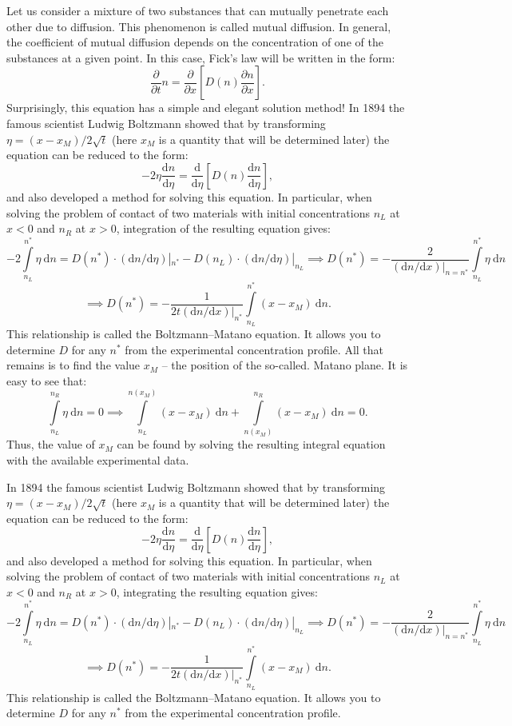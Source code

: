 \documentclass[11pt,a4paper]{article}
\begin{document}
Let us consider a mixture of two substances that can mutually penetrate each other due to diffusion. This phenomenon is called mutual diffusion. In general, the coefficient of mutual diffusion depends on the concentration of one of the substances at a given point. In this case, Fick's law will be written in the form: \[\frac{\partial}{\partial t}n=\frac{\partial}{\partial x}\left[D(n)\frac{\partial n}{\partial x}\right].\]Surprisingly, this equation has a simple and elegant solution method! In 1894 the famous scientist Ludwig Boltzmann showed that by transforming $\eta=(x-x_M)/2\sqrt t$ (here $x_M$ is a quantity that will be determined later) the equation can be reduced to the form: \[-2\eta\frac{\mathrm dn}{\mathrm d\eta}=\frac{\mathrm d}{\mathrm d\eta}\left[D(n)\frac{\mathrm dn}{\mathrm d\eta}\right],\] and also developed a method for solving this equation. In particular, when solving the problem of contact of two materials with initial concentrations $n_L$ at $x < 0$ and $n_R$ at $x > 0$, integration of the resulting equation gives: \[-2\int\limits_{n_L}^{n^*}\eta~\mathrm dn=D(n^*)\cdot(\mathrm dn{/}\mathrm d\eta)|_{n^*}-D(n_L)\cdot(\mathrm dn{/}\mathrm d\eta)|_{n_L}\implies D(n^*)=-\frac2{(\mathrm dn{/}\mathrm dx)|_{n=n^*}}\int\limits_{n_L}^{n^*}\eta~\mathrm dn\]\[\implies D(n^*)=-\frac1{2t(\mathrm dn{/}\mathrm dx)|_{n^*}}\int\limits_{n_L}^{n^*}(x-x_M)~\mathrm dn.\]This relationship is called the Boltzmann–Matano equation. It allows you to determine $D$ for any $n^*$ from the experimental concentration profile. All that remains is to find the value $x_M$ – the position of the so-called. Matano plane. It is easy to see that:\[\int\limits_{n_L}^{n_R}\eta~\mathrm dn=0\implies\int\limits_{n_L}^{n(x_M)}(x-x_M)~\mathrm dn+\int\limits_{n(x_M)}^{n_R}(x-x_M)~\mathrm dn=0.\]Thus, the value of $x_M$ can be found by solving the resulting integral equation with the available experimental data.

In 1894 the famous scientist Ludwig Boltzmann showed that by transforming $\eta=(x-x_M)/2\sqrt t$ (here $x_M$ is a quantity that will be determined later) the equation can be reduced to the form: \[-2\eta\frac{\mathrm dn}{\mathrm d\eta}=\frac{\mathrm d}{\mathrm d\eta}\left[D(n)\frac{\mathrm dn}{\mathrm d\eta}\right],\] and also developed a method for solving this equation. In particular, when solving the problem of contact of two materials with initial concentrations $n_L$ at $x < 0$ and $n_R$ at $x > 0$, integrating the resulting equation gives: \[-2\int\limits_{n_L}^{n^*}\eta~\mathrm dn=D(n^*)\cdot(\mathrm dn{/}\mathrm d\eta)|_{n^*}-D(n_L)\cdot(\mathrm dn{/}\mathrm d\eta)|_{n_L}\implies D(n^*)=-\frac2{(\mathrm dn{/}\mathrm dx)|_{n=n^*}}\int\limits_{n_L}^{n^*}\eta~\mathrm dn\]\[\implies D(n^*)=-\frac1{2t(\mathrm dn{/}\mathrm dx)|_{n^*}}\int\limits_{n_L}^{n^*}(x-x_M)~\mathrm dn.\]This relationship is called the Boltzmann–Matano equation. It allows you to determine $D$ for any $n^*$ from the experimental concentration profile.
\end{document}
